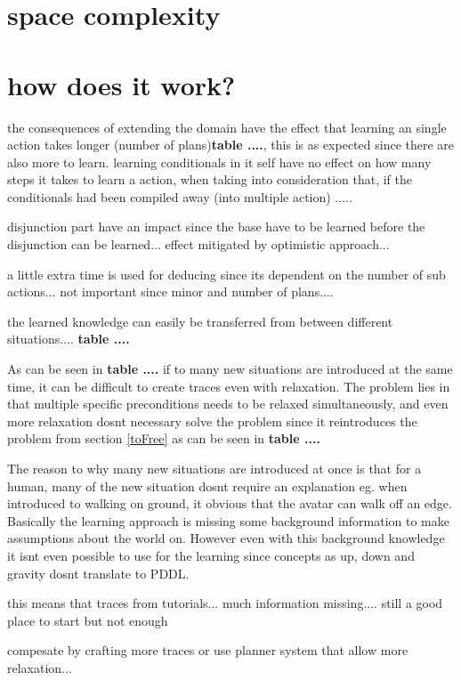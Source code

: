 \section{space complexity}

	
\section{how does it work?}	
	the consequences of extending the domain have the effect that learning an single action takes longer (number of plans)\textbf{table ....}, this is as expected since there are also more to learn. learning conditionals in it self have no effect on how many steps it takes to learn a action, when taking into consideration that, if the conditionals had been compiled away (into multiple action) .....
	
	disjunction part have an impact since the base have to be learned before the disjunction can be learned... effect mitigated by optimistic approach... 
	
	a little extra time is used for deducing since its dependent on the number of sub actions... not important since minor and number of plans....
	
	
	the learned knowledge can easily be transferred from between different situations.... \textbf{table ....}
	
	As can be seen in \textbf{table ....} if to many new situations are introduced at the same time, it can be difficult to create traces even with relaxation. The problem lies in that multiple specific preconditions needs to be relaxed simultaneously, and even more relaxation dosnt necessary solve the problem since it reintroduces the problem from section \ref{toFree} as can be seen in \textbf{table ....}
	
	The reason to why many new situations are introduced at once is that for a human, many of the new situation dosnt require an explanation eg. when introduced to walking on ground, it obvious that the avatar can walk off an edge. Basically the learning approach is missing some background information to make assumptions about the world on. However even with this background knowledge it isnt even possible to use for the learning since concepts as up, down and gravity dosnt translate to PDDL. 
	 
	 this means that traces from tutorials... much information missing.... still a good place to start but not enough
	 
	 compesate by crafting more traces or use planner system that allow more relaxation...
	
	
